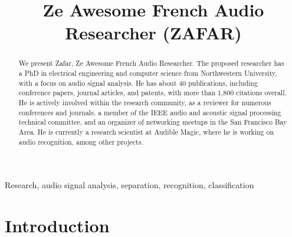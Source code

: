 \documentclass{article}
\title{Ze Awesome French Audio Researcher (ZAFAR)}
\begin{document}
\maketitle

\begin{abstract}
We present Zafar, Ze Awesome French Audio Researcher. The proposed researcher has a PhD in electrical engineering and computer science from Northwestern University, with a focus on audio signal analysis. He has about 40 publications, including conference papers, journal articles, and patents, with more than 1,800 citations overall. He is actively involved within the research community, as a reviewer for numerous conferences and journals, a member of the IEEE audio and acoustic signal processing technical committee, and an organizer of networking meetups in the San Francisco Bay Area. He is currently a research scientist at Audible Magic, where he is working on audio recognition, among other projects.
\end{abstract}

\begin{keywords}
Research, audio signal analysis, separation, recognition, classification
\end{keywords}

\section{Introduction}
\label{sec:intro}

\nocite{patent_cremer_may2021}
\nocite{patent_rafii_may2021}
\nocite{patent_cremer_feb2021}
\nocite{patent_rafii_jan2021}
\nocite{patent_rafii_dec2020}
\nocite{patent_rafii_oct20202}
\nocite{patent_rafii_oct2020}
\nocite{patent_rafii_jul20202}
\nocite{patent_rafii_jul2020}
\nocite{patent_coover_mar2020}
\nocite{patent_pardo_jul2015}

\nocite{article_rafii_may2022}
\nocite{article_rafii_nov2018}
\nocite{article_rafii_aug2018}
\nocite{article_rafii_dec2014}
\nocite{article_liutkus_aug2014}
\nocite{article_rafii_jan2013}
\nocite{article_sabin_jun2013}

\nocite{inproceedings_vartakavi_aug2021}
\nocite{inproceedings_kim_sep2018}
\nocite{inproceedings_seetharaman_mar2017}
\nocite{inproceedings_fitzgerald_mar2017}
\nocite{inproceedings_liutkus_feb2017}
\nocite{inproceedings_ono_aug2015}
\nocite{inproceedings_rafii_apr2015}
\nocite{inproceedings_liutkus_apr2015}
\nocite{inproceedings_fitzgerald_jun2014}
\nocite{inproceedings_liutkus_may2014}
\nocite{inproceedings_rafii_may2014}
\nocite{inproceedings_rafii_nov2013}
\nocite{inproceedings_rafii_may2013}
\nocite{inproceedings_rafii_oct2012}
\nocite{inproceedings_liutkus_mar2012}
\nocite{inproceedings_cartwright_aug2011}
\nocite{inproceedings_rafii_may2011}
\nocite{inproceedings_rafii_may2011_2}
\nocite{inproceedings_rafii_oct2009}
\end{document}
